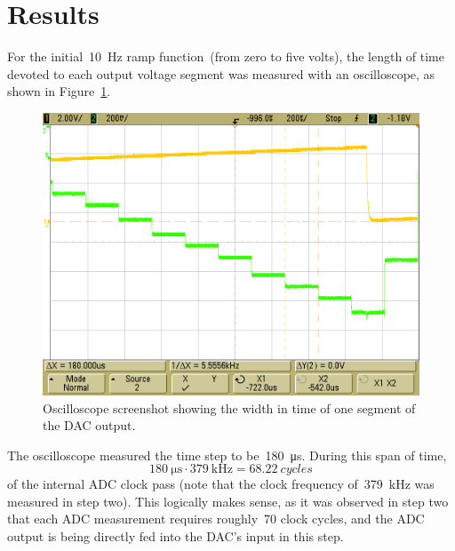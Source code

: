 \section{Results}

For the initial~\SI{10}{\hertz} ramp function~(from zero to five volts), the
length of time devoted to each output voltage segment was measured with an
oscilloscope, as shown in Figure~\ref{f:time_step}.
%
\begin{figure}[H]
\centering
	\includegraphics[width=.8\textwidth]{img/shot/ramp_timestep.png}
	\parbox{.8\textwidth}{
	\caption[Segment time]{Oscilloscope screenshot showing the width in time of
	one segment of the DAC output.}
	\label{f:time_step}}
\end{figure}
%
The oscilloscope measured the time step to be~\SI{180}{\micro\second}.  During
this span of time,
%
\begin{equation*}
	\SI{180}{\micro\second} \cdot \SI{379}{\kilo\hertz} = \SI{68.22}{cycles}
\end{equation*}
%
of the internal ADC clock pass (note that the clock frequency
of~\SI{379}{\kilo\hertz} was measured in step two).  This logically makes
sense, as it was observed in step two that each ADC measurement requires
roughly~70 clock cycles, and the ADC output is being directly fed into the
DAC's input in this step.

